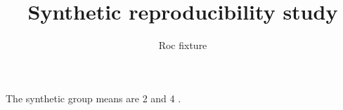 \documentclass{article}
\begin{document}
\title{Synthetic reproducibility study}
\author{Roc fixture}
\maketitle
The synthetic group means are 2 and 4 \cite{rocfixture}.


\end{document}
